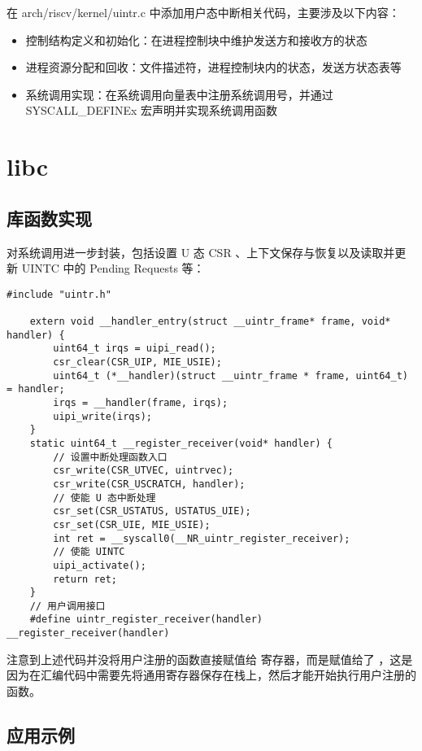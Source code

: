 在 arch/riscv/kernel/uintr.c 中添加用户态中断相关代码，主要涉及以下内容：

\begin{itemize}
    \item 控制结构定义和初始化：在进程控制块中维护发送方和接收方的状态
    \item 进程资源分配和回收：文件描述符，进程控制块内的状态，发送方状态表等
    \item 系统调用实现：在系统调用向量表中注册系统调用号，并通过 SYSCALL\_DEFINEx 宏声明并实现系统调用函数
\end{itemize}

\section{libc}

\subsection{库函数实现}

对系统调用进一步封装，包括设置 U 态 CSR 、上下文保存与恢复以及读取并更新 UINTC 中的 Pending Requests 等：

\begin{lstlisting}[style=CStyle]
    #include "uintr.h"

    extern void __handler_entry(struct __uintr_frame* frame, void* handler) {
        uint64_t irqs = uipi_read();
        csr_clear(CSR_UIP, MIE_USIE);
        uint64_t (*__handler)(struct __uintr_frame * frame, uint64_t) = handler;
        irqs = __handler(frame, irqs);
        uipi_write(irqs);
    }
    static uint64_t __register_receiver(void* handler) {
        // 设置中断处理函数入口
        csr_write(CSR_UTVEC, uintrvec);
        csr_write(CSR_USCRATCH, handler);
        // 使能 U 态中断处理
        csr_set(CSR_USTATUS, USTATUS_UIE);
        csr_set(CSR_UIE, MIE_USIE);
        int ret = __syscall0(__NR_uintr_register_receiver);
        // 使能 UINTC 
        uipi_activate();
        return ret;
    }
    // 用户调用接口
    #define uintr_register_receiver(handler) __register_receiver(handler)
\end{lstlisting}

注意到上述代码并没将用户注册的函数直接赋值给 \Rutvec 寄存器，而是赋值给了 \Ruscratch ，这是因为在汇编代码中需要先将通用寄存器保存在栈上，然后才能开始执行用户注册的函数。

\subsection{应用示例}

